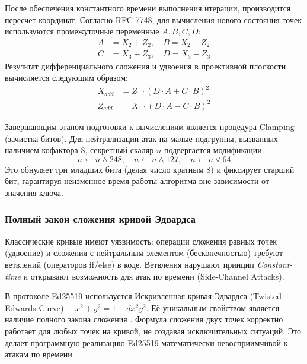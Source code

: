 После обеспечения константного времени выполнения итерации, производится пересчет координат. Согласно RFC 7748, для вычисления нового состояния точек используются промежуточные переменные $A, B, C, D$:
\begin{equation}
\begin{aligned}
    A &= X_2 + Z_2, \quad B = X_2 - Z_2 \\
    C &= X_3 + Z_3, \quad D = X_3 - Z_3
\end{aligned}
\end{equation}
Результат дифференциального сложения и удвоения в проективной плоскости вычисляется следующим образом:
\begin{equation}
\begin{aligned}
    X_{add} &= Z_1 \cdot (D \cdot A + C \cdot B)^2 \\
    Z_{add} &= X_1 \cdot (D \cdot A - C \cdot B)^2
\end{aligned}
\end{equation}

Завершающим этапом подготовки к вычислениям является процедура Clamping (зачистка битов). Для нейтрализации атак на малые подгруппы, вызванных наличием кофактора 8, секретный скаляр $n$ подвергается модификации:
\begin{equation}
    n \gets n \land 248, \quad n \gets n \land 127, \quad n \gets n \lor 64
\end{equation}
Это обнуляет три младших бита (делая число кратным 8) и фиксирует старший бит, гарантируя неизменное время работы алгоритма вне зависимости от значения ключа.

\subsubsection{Полный закон сложения кривой Эдвардса}
Классические кривые имеют уязвимость: операции сложения равных точек (удвоение) и сложения с нейтральным элементом (бесконечностью) требуют ветвлений (операторов if/else) в коде. Ветвления нарушают принцип \textit{Constant-time} и открывают возможность для атак по времени (Side-Channel Attacks).

В протоколе Ed25519 используется Искривленная кривая Эдвардса (Twisted Edwards Curve): $-x^2 + y^2 = 1 + dx^2y^2$. Её уникальным свойством является наличие полного закона сложения \cite{RFC8032}. Формула сложения двух точек корректно работает для любых точек на кривой, не создавая исключительных ситуаций. Это делает программную реализацию Ed25519 математически невосприимчивой к атакам по времени.

